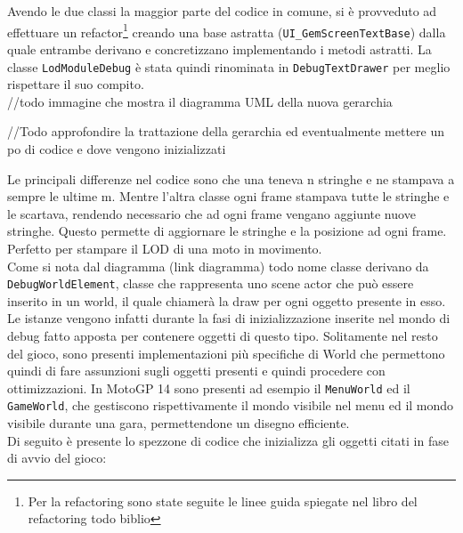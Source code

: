 Avendo le due classi la maggior parte del codice in comune, si è provveduto ad effettuare un refactor\footnote{Per la refactoring sono state seguite le linee guida spiegate nel libro del refactoring todo biblio} creando una base astratta (\texttt{UI\_GemScreenTextBase}) dalla quale entrambe derivano e concretizzano implementando i metodi astratti. La classe \texttt{LodModuleDebug} è stata quindi rinominata in \texttt{DebugTextDrawer} per meglio rispettare il suo compito.\\

//todo immagine che mostra il diagramma UML della nuova gerarchia

//Todo approfondire la trattazione della gerarchia ed eventualmente mettere un po di codice e dove vengono inizializzati

Le principali differenze nel codice sono che una teneva n stringhe e ne stampava a sempre le ultime m. Mentre l'altra classe ogni frame stampava tutte le stringhe e le scartava, rendendo necessario che ad ogni frame vengano aggiunte nuove stringhe. Questo permette di aggiornare le stringhe e la posizione ad ogni frame. Perfetto per stampare il LOD di una moto in movimento.\\

Come si nota dal diagramma (link diagramma) todo nome classe derivano da \texttt{DebugWorldElement}, classe che rappresenta uno scene actor che può essere inserito in un world, il quale chiamerà la draw per ogni oggetto presente in esso.\\

Le istanze vengono infatti durante la fasi di inizializzazione inserite nel mondo di debug fatto apposta per contenere oggetti di questo tipo. Solitamente nel resto del gioco, sono presenti implementazioni più specifiche di World che permettono quindi di fare assunzioni sugli oggetti presenti e quindi procedere con ottimizzazioni. In MotoGP 14 sono presenti ad esempio il \texttt{MenuWorld} ed il \texttt{GameWorld}, che gestiscono rispettivamente il mondo visibile nel menu ed il mondo visibile durante una gara, permettendone un disegno efficiente.\\

Di seguito è presente lo spezzone di codice che inizializza gli oggetti citati in fase di avvio del gioco:

